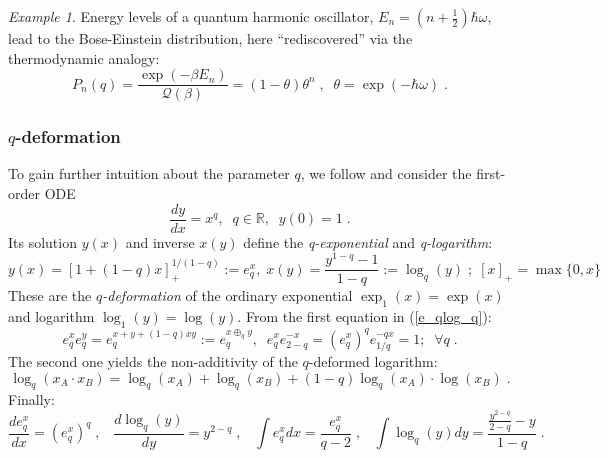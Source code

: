 \documentclass[a4paper,12pt]{amsart}
\theoremstyle{definition}
\theoremstyle{remark}
\newtheorem{Example}{Example}[section]
\begin{document}
\begin{Example}
Energy levels of a quantum harmonic oscillator, $E_n \!=\! (n\!+\!\tfrac{1}{2})\hbar\omega$, lead to the Bose-Einstein distribution, here ``rediscovered'' via the thermodynamic analogy: 
\begin{equation}
P_n(q)=\frac{\exp(-\beta E_n)}{\mathcal{Q}(\beta)} =
(1\!-\!\theta)\theta^n\;,\;\;\theta = \exp(-\hbar \omega) \;.
\end{equation}
\end{Example}
\subsubsection{$q$-deformation}
To gain further intuition about the parameter $q$,  we follow \cite{Tsallis:2009zex}  and consider the first-order ODE
\[
\frac{dy}{dx}=x^q,\;\; q\in\mathbb{R},\;\; y(0)=1\;.
\]
Its solution $y(x)$ and inverse $x(y)$ define the {\it q-exponential} and {\it q-logarithm}:
\begin{equation}\label{e_qlog_q}
    y(x)=[1+(1-q)x]_{+}^{1/(1-q)}:=e_q^{x},\; x(y)=\frac{y^{1-q}-1}{1-q}:=\log_q(y)\;;\;[x]_{+}=\max\{0,x\}
\end{equation}
These are the {\it $q$-deformation} of the ordinary exponential $\exp_1(x)\!=\!\exp(x)$ and logarithm $\log_1(y)\!=\!\log(y)$.
From the first equation in (\ref{e_qlog_q}):
\begin{equation}\label{e_qprod}
e^x_q e^y_q=e^{x+y+(1-q)x y}_q:=e^{x \oplus_q y}_q,\;\;e^x_q e^{-x}_{2-q}= (e^x_q)^qe^{-qx}_{1/q}=1; \;\; \forall q\;.    
\end{equation}
The second one yields the non-additivity of the $q$-deformed logarithm:
\begin{equation}\label{log_qprod}
\log_q(x_A\cdot x_B)=\log_q(x_A)+\log_q(x_B)+(1-q)\log_q(x_A)\cdot \log(x_B)\;.    
\end{equation}
Finally:
\begin{equation}\label{de_qdlog_q}
\frac{d e_q^x}{dx}=(e_q^x)^q\;,\;\;\; \frac{d \log_q(y)}{dy}=y^{2-q}\;,\;\;\; \int e_q^x dx=\frac{e_q^x}{q-2}\;,\;\;\;\int\log_q(y)dy=\frac{\frac{y^{2-q}}{2-q}-y}{1-q} \;.
\end{equation}
\end{document}
